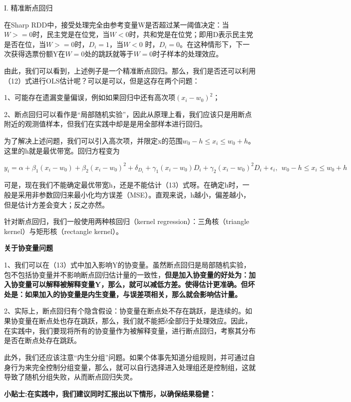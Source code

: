 \documentclass[cn,10pt,math=newtx,citestyle=gb7714-2015,bibstyle=gb7714-2015]{elegantbook}
\begin{document}
	I. 精准断点回归
	
	在Sharp RDD中，接受处理完全由参考变量W是否超过某一阈值决定：当$W>=0$时，民主党是在位党，当$W<0$时，共和党是在位党；即用D表示民主党是否在位，当$W>=0$时，$D_i=1$，当$W<0$ 时，$D_i=0$。在这种情形下，下一次获得选票份额Y在$W=0$处的跳跃就等于$W=0$时子样本的处理效应。
	
	由此，我们可以看到，上述例子是一个精准断点回归。那么，我们是否还可以利用（12）式进行OLS估计呢？可以是可以，但是这存在两个问题：
	
	1、可能存在遗漏变量偏误，例如如果回归中还有高次项$(x_i-w_0)^2$；
	
	2、断点回归可以看作是“局部随机实验”，因此从原理上看，我们应该只是用断点附近的观测值样本，但我们在实践中却是是用全部样本进行回归。
	
	为了解决上述问题，我们可以引入高次项，并限定x的范围$w_0-h\le{x_i}\le{w_0+h}$。这里的h就是最优带宽。回归方程变为
	
	\begin{equation}
		y_i=\alpha+\beta_1(x_i-w_0)+\beta_2(x_i-w_0)^2+\delta_{D_i}+\gamma_1(x_i-w_0)D_i+\gamma_2(x_i-w_0)^2D_i+\epsilon_i,~~w_0-h\le{x_i}\le{w_0+h}
	\end{equation}
	
	可是，现在我们不能确定最优带宽h，还是不能估计（13）式呀。在确定h时，一般是采用非参数回归来最小化均方误差（MSE）。直观来说，h越小，偏差越小，但是估计方差会变大；反之亦然。
	
	针对断点回归，我们一般使用两种核回归（kernel regression）：三角核（triangle kernel）与矩形核（rectangle kernel）。
	
	\textbf{关于协变量问题}
	
	1、我们可以在（13）式中加入影响Y的协变量。虽然断点回归是局部随机实验，包不包括协变量并不影响断点回归估计量的一致性，\textbf{但是加入协变量的好处为：加入协变量可以解释被解释变量Y，那么，就可以减低方差。使得估计更准确。但坏处是：如果加入的协变量是内生变量，与误差项相关，那么就会影响估计量。}
	
	2、实际上，断点回归有个隐含假设：协变量在断点处不存在跳跃，是连续的。如果协变量在断点处也存在跳跃，那么，我们就不能把$\tilde{\delta}$全部归于处理效应。因此，在实践中，我们要现将所有的协变量作为被解释变量，进行断点回归，考察其分布是否在断点处存在跳跃。
	
	此外，我们还应该注意“内生分组”问题。如果个体事先知道分组规则，并可通过自身行为来完全控制分组变量，那么，就可以自行选择进入处理组还是控制组，这就导致了随机分组失败，从而断点回归失灵。
	
	\textbf{小贴士:在实践中，我们建议同时汇报出以下情形，以确保结果稳健：}
	
\end{document}

